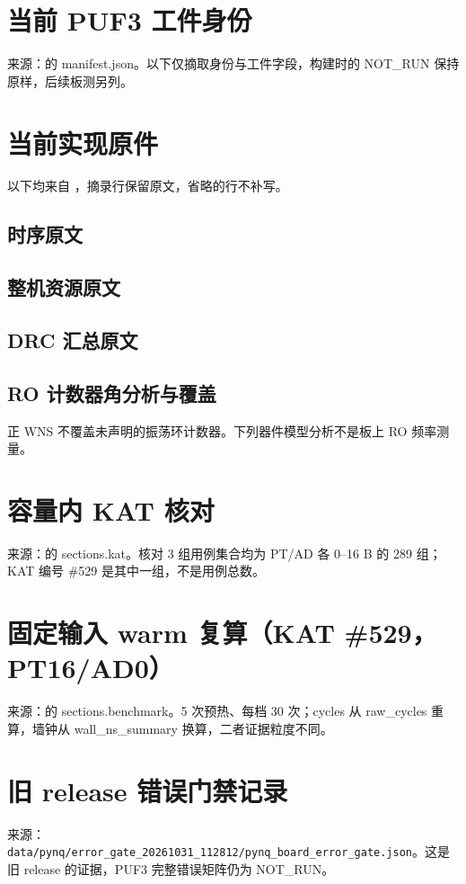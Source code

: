 \Needspace{85pt}
\section{当前 PUF3 工件身份}
来源：\pufcandidate 的 manifest.json。以下仅摘取身份与工件字段，构建时的 NOT\_RUN 保持原样，后续板测另列。


\Needspace{85pt}
\section{当前实现原件}
以下均来自 \pufreports，摘录行保留原文，省略的行不补写。
\subsection{时序原文}

\subsection{整机资源原文}

\subsection{DRC 汇总原文}

\subsection{RO 计数器角分析与覆盖}
正 WNS 不覆盖未声明的振荡环计数器。下列器件模型分析不是板上 RO 频率测量。


\Needspace{85pt}
\section{容量内 KAT 核对}
来源：\pufresult 的 sections.kat。核对 3 组用例集合均为 PT/AD 各 0--16 B 的 289 组；KAT 编号 \#529 是其中一组，不是用例总数。


\Needspace{85pt}
\section{固定输入 warm 复算（KAT \#529，PT16/AD0）}
来源：\pufresult 的 sections.benchmark。5 次预热、每档 30 次；cycles 从 raw\_cycles 重算，墙钟从 wall\_ns\_summary 换算，二者证据粒度不同。


\Needspace{85pt}
\section{旧 release 错误门禁记录}
来源：\texttt{data/pynq/error\_gate\_20261031\_112812/\allowbreak{}pynq\_board\_error\_gate.json}。这是旧 release 的证据，PUF3 完整错误矩阵仍为 NOT\_RUN。


